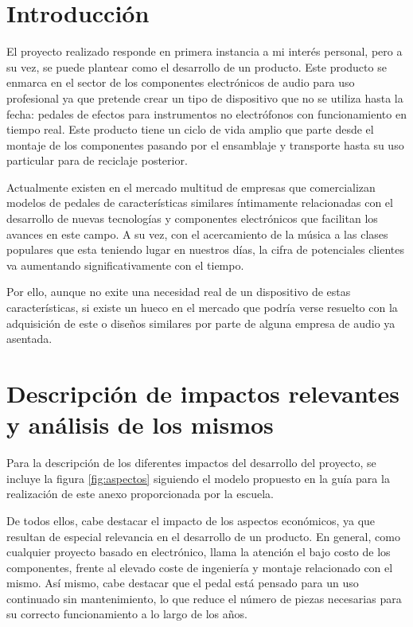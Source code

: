 \section{Introducción}
El proyecto realizado responde en primera instancia a mi interés personal, pero a su vez, se puede plantear como el desarrollo de un producto. Este producto se enmarca en el sector de los componentes electrónicos de audio para uso profesional ya que pretende crear un tipo de dispositivo que no se utiliza hasta la fecha: pedales de efectos para instrumentos no electrófonos con funcionamiento en tiempo real. Este producto tiene un ciclo de vida amplio que parte desde el montaje de los componentes pasando por el ensamblaje y transporte hasta su uso particular para de reciclaje posterior. 

Actualmente existen en el mercado multitud de empresas que comercializan modelos de pedales de características similares íntimamente relacionadas con el desarrollo de nuevas tecnologías y componentes electrónicos que facilitan los avances en este campo. A su vez, con el acercamiento de la música a las clases populares que esta teniendo lugar en nuestros días, la cifra de potenciales clientes va aumentando significativamente con el tiempo.

Por ello, aunque no exite una necesidad real de un dispositivo de estas características, si existe un hueco en el mercado que podría verse resuelto con la adquisición de este o diseños similares por parte de alguna empresa de audio ya asentada.
\section{Descripción de impactos relevantes y análisis de los mismos}
Para la descripción de los diferentes impactos del desarrollo del proyecto, se incluye la figura \ref{fig:aspectos} siguiendo el modelo propuesto en la guía para la realización de este anexo proporcionada por la escuela.

De todos ellos, cabe destacar el impacto de los aspectos económicos, ya que resultan de especial relevancia en el desarrollo de un producto. En general, como cualquier proyecto basado en electrónico, llama la atención el bajo costo de los componentes, frente al elevado coste de ingeniería y montaje relacionado con el mismo. Así mismo, cabe destacar que el pedal está pensado para un uso continuado sin mantenimiento, lo que reduce el número de piezas necesarias para su correcto funcionamiento a lo largo de los años.


